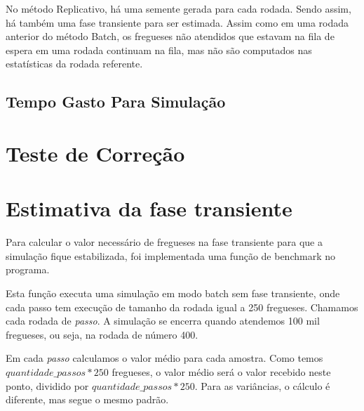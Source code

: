 \documentclass[a4paper,10pt]{article}
\begin{document}
    No método Replicativo, há uma semente gerada para cada rodada. Sendo assim, há também uma fase transiente para ser estimada. Assim como em uma rodada anterior do método Batch, os fregueses não atendidos que estavam na fila de espera em uma rodada continuam na fila, mas não são computados nas estatísticas da rodada referente.


\subsection{Tempo Gasto Para Simulação}

\pagebreak

\section{Teste de Correção}
\pagebreak

\section{Estimativa da fase transiente}
    Para calcular o valor necessário de fregueses na fase transiente para que a simulação fique estabilizada, foi implementada uma função de benchmark no
programa.

    Esta função executa uma simulação em modo batch sem fase transiente, onde cada passo tem execução de tamanho da rodada igual a 250 fregueses.
Chamamos cada rodada de \emph{passo}. A simulação se encerra quando atendemos 100 mil fregueses, ou seja, na rodada de número 400.

    Em cada \emph{passo} calculamos o valor médio para cada amostra. Como temos $quantidade\_passos * 250$ fregueses, o valor médio será o valor recebido
neste ponto, dividido por $quantidade\_passos * 250$. Para as variâncias, o cálculo é diferente, mas segue o mesmo padrão.
\end{document}
